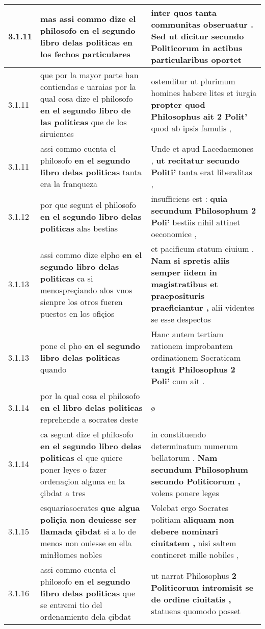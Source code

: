 \begin{tabular}{|p{1cm}|p{6.5cm}|p{6.5cm}|}
3.1.11 & mas assi commo dize el philosofo \textbf{ en el segundo libro delas politicas } en los fechos particulares & inter quos tanta communitas obseruatur . \textbf{ Sed ut dicitur secundo Politicorum } in actibus particularibus oportet \\\hline
3.1.11 & que por la mayor parte han contiendas e uaraias por la qual cosa dize el philosofo \textbf{ en el segundo libro de las politicas } que de los siruientes & ostenditur ut plurimum homines habere lites et iurgia \textbf{ propter quod Philosophus ait 2 Polit’ } quod ab ipsis famulis , \\\hline
3.1.11 & assi commo cuenta el philosofo \textbf{ en el segundo libro delas politicas } tanta era la franqueza & Unde et apud Lacedaemones , \textbf{ ut recitatur secundo Politi’ } tanta erat liberalitas , \\\hline
3.1.12 & por que segunt el philosofo \textbf{ en el segundo libro delas politicas } alas bestias & insufficiens est : \textbf{ quia secundum Philosophum 2 Poli’ } bestiis nihil attinet oeconomice , \\\hline
3.1.13 & assi commo dize elpho \textbf{ en el segundo libro delas politicas } ca si menospreçiando alos vnos sienpre los otros fueren puestos en los ofiçios & et pacificum statum ciuium . \textbf{ Nam si spretis aliis semper iidem in magistratibus et praeposituris praeficiantur , } alii videntes se esse despectos \\\hline
3.1.13 & pone el pho \textbf{ en el segundo libro delas politicas } quando & Hanc autem tertiam rationem improbantem ordinationem Socraticam \textbf{ tangit Philosophus 2 Poli’ } cum ait . \\\hline
3.1.14 & por la qual cosa el philosofo \textbf{ en el libro delas politicas } reprehende a socrates deste & ø \\\hline
3.1.14 & ca segunt dize el philosofo \textbf{ en el segundo libro delas politicas } el que quiere poner leyes o fazer ordenaçion alguna en la çibdat a tres & in constituendo determinatum numerum bellatorum . \textbf{ Nam secundum Philosophum secundo Politicorum , } volens ponere leges \\\hline
3.1.15 & esquariasocrates \textbf{ que algua poliçia non deuiesse ser llamada çibdat } si a lo de menos non ouiesse en ella minłłomes nobles & Volebat ergo Socrates politiam \textbf{ aliquam non debere nominari ciuitatem , } nisi saltem contineret mille nobiles , \\\hline
3.1.16 & assi commo cuenta el philosofo \textbf{ en el segundo libro delas politicas } que se entremi tio del ordenamiento dela çibdat & ut narrat Philosophus \textbf{ 2 Politicorum intromisit se de ordine ciuitatis , } statuens quomodo posset \\\hline

\end{tabular}

